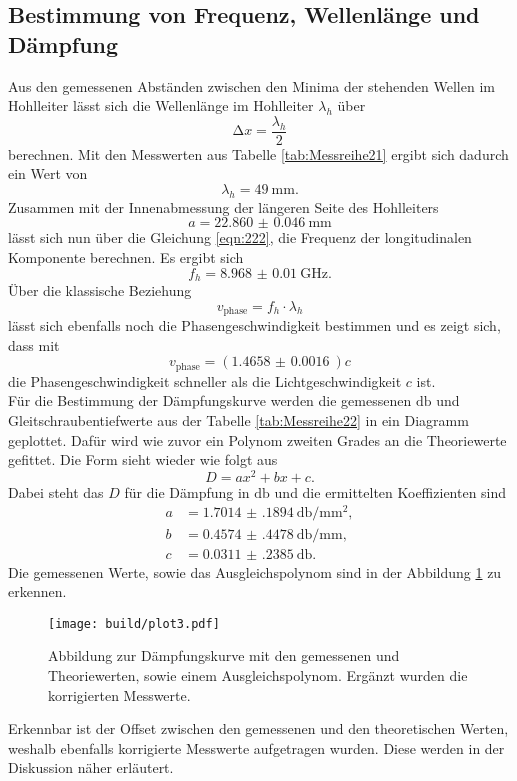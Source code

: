 \subsection{Bestimmung von Frequenz, Wellenlänge und Dämpfung}
Aus den gemessenen Abständen zwischen den Minima der stehenden Wellen im Hohlleiter lässt sich die Wellenlänge im Hohlleiter $\lambda_h$ über
\begin{equation*}
\increment x = \frac{\lambda_h}{2}
\end{equation*}
berechnen. Mit den Messwerten aus Tabelle \ref{tab:Messreihe21} ergibt sich dadurch ein Wert von
\begin{equation*}
\lambda_h = \SI{49}{\milli\meter}.
\end{equation*}
Zusammen mit der Innenabmessung der längeren Seite des Hohlleiters
\begin{equation*}
a = \SI{22.860(46)}{\milli\meter}
\end{equation*}
lässt sich nun über die Gleichung \ref{eqn:222}, die Frequenz der longitudinalen Komponente berechnen.
Es ergibt sich 
\begin{equation*}
f_h = \SI{8.968(10)}{\giga\hertz}.
\end{equation*}
Über die klassische Beziehung 
\begin{equation*}
v_{\text{phase}} = f_h \cdot \lambda_h
\end{equation*}
lässt sich ebenfalls noch die Phasengeschwindigkeit bestimmen und es zeigt sich, dass mit 
\begin{equation*}
v_{\text{phase}} = \left(\SI{1.4658(16)}{}\right) c
\end{equation*}
die Phasengeschwindigkeit schneller als die Lichtgeschwindigkeit $c$ ist. 
\\
\newline
Für die Bestimmung der Dämpfungskurve werden die gemessenen $\si{\decibel}$ und Gleitschraubentiefwerte aus der Tabelle \ref{tab:Messreihe22} in ein Diagramm geplottet.
Dafür wird wie zuvor ein Polynom zweiten Grades an die Theoriewerte gefittet. Die Form sieht wieder wie folgt aus
\begin{equation*}
D = ax^2 + bx + c.
\end{equation*}
Dabei steht das $D$ für die Dämpfung in $\si{\decibel}$ und die ermittelten Koeffizienten sind
\begin{align*}
a &= \SI{1.7014(1894)}{\decibel\per\milli\meter\squared}, \\
b &= \SI{0.4574(4478)}{\decibel\per\milli\meter}, \\
c &= \SI{0.0311(2385)}{\decibel}.
\end{align*}
Die gemessenen Werte, sowie das Ausgleichspolynom sind in der Abbildung \ref{111} zu erkennen.
\begin{figure}
    \centering
    \texttt{[image: build/plot3.pdf]}
    \caption{Abbildung zur Dämpfungskurve mit den gemessenen und Theoriewerten, sowie einem Ausgleichspolynom. Ergänzt wurden die korrigierten Messwerte.} 
    \label{111}
\end{figure}
Erkennbar ist der Offset zwischen den gemessenen und den theoretischen Werten, weshalb ebenfalls korrigierte Messwerte aufgetragen wurden. Diese werden in der Diskussion näher
erläutert.

